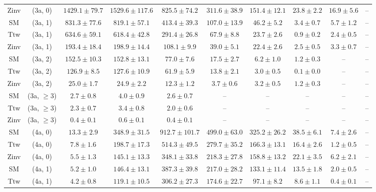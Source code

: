 \begin{table}[h!]
{\begin{tabular}{cccccccccc}
	Zinv & (3a, 0) & $1429.1\pm 79.7$ & $1529.6\pm 117.6$ & $825.5\pm 74.2$ & $311.6\pm 38.9$ & $151.4\pm 12.1$ & $23.8\pm 2.2$ & $16.9\pm 5.6$ & -- \\[0.5ex] 
	SM & (3a, 1) & $831.3\pm 77.6$ & $819.1\pm 57.1$ & $413.4\pm 39.3$ & $107.0\pm 13.9$ & $46.2\pm 5.2$ & $3.4\pm 0.7$ & $5.7\pm 1.2$ & -- \\[0.5ex] 
	Ttw & (3a, 1) & $634.6\pm 59.1$ & $618.4\pm 42.8$ & $291.4\pm 26.8$ & $67.9\pm 8.8$ & $23.7\pm 2.6$ & $0.9\pm 0.2$ & $2.4\pm 0.5$ & -- \\[0.5ex] 
	Zinv & (3a, 1) & $193.4\pm 18.4$ & $198.9\pm 14.4$ & $108.1\pm 9.9$ & $39.0\pm 5.1$ & $22.4\pm 2.6$ & $2.5\pm 0.5$ & $3.3\pm 0.7$ & -- \\[0.5ex] 
	SM & (3a, 2) & $152.5\pm 10.3$ & $152.8\pm 13.1$ & $77.0\pm 7.6$ & $17.5\pm 2.7$ & $6.2\pm 1.0$ & $1.2\pm 0.3$ & -- & -- \\[0.5ex] 
	Ttw & (3a, 2) & $126.9\pm 8.5$ & $127.6\pm 10.9$ & $61.9\pm 5.9$ & $13.8\pm 2.1$ & $3.0\pm 0.5$ & $0.1\pm 0.0$ & -- & -- \\[0.5ex] 
	Zinv & (3a, 2) & $25.0\pm 1.7$ & $24.9\pm 2.2$ & $12.3\pm 1.2$ & $3.7\pm 0.6$ & $3.2\pm 0.5$ & $1.2\pm 0.3$ & -- & -- \\[0.5ex] 
	SM & (3a, $\ge3$) & $2.7\pm 0.8$ & $4.0\pm 0.9$ & $2.6\pm 0.7$ & -- & -- & -- & -- & -- \\[0.5ex] 
	Ttw & (3a, $\ge3$) & $2.3\pm 0.7$ & $3.4\pm 0.8$ & $2.0\pm 0.6$ & -- & -- & -- & -- & -- \\[0.5ex] 
	Zinv & (3a, $\ge3$) & $0.4\pm 0.1$ & $0.6\pm 0.1$ & $0.4\pm 0.1$ & -- & -- & -- & -- & -- \\[0.5ex] 
	SM & (4a, 0) & $13.3\pm 2.9$ & $348.9\pm 31.5$ & $912.7\pm 101.7$ & $499.0\pm 63.0$ & $325.2\pm 26.2$ & $38.5\pm 6.1$ & $7.4\pm 2.6$ & -- \\[0.5ex] 
	Ttw & (4a, 0) & $7.8\pm 1.6$ & $198.7\pm 17.3$ & $514.3\pm 49.5$ & $279.7\pm 35.2$ & $166.3\pm 13.1$ & $16.4\pm 2.6$ & $1.2\pm 0.5$ & -- \\[0.5ex] 
	Zinv & (4a, 0) & $5.5\pm 1.3$ & $145.1\pm 13.3$ & $348.1\pm 33.8$ & $218.3\pm 27.8$ & $158.8\pm 13.2$ & $22.1\pm 3.5$ & $6.2\pm 2.1$ & -- \\[0.5ex] 
	SM & (4a, 1) & $5.2\pm 1.0$ & $146.4\pm 13.1$ & $387.3\pm 39.8$ & $217.0\pm 28.2$ & $133.1\pm 11.4$ & $13.5\pm 1.8$ & $2.0\pm 0.5$ & -- \\[0.5ex] 
	Ttw & (4a, 1) & $4.2\pm 0.8$ & $119.1\pm 10.5$ & $306.2\pm 27.3$ & $174.6\pm 22.7$ & $97.1\pm 8.2$ & $8.6\pm 1.1$ & $0.4\pm 0.1$ & -- \\[0.5ex] 

\end{tabular}}
\end{table}
